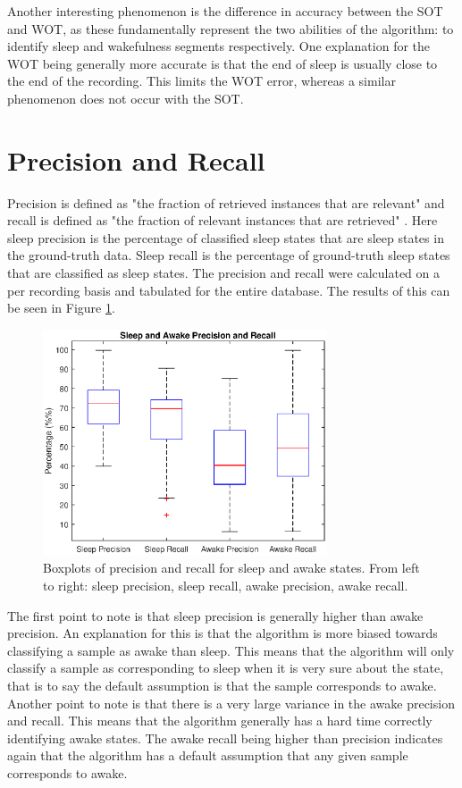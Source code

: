             Another interesting phenomenon is the difference in accuracy between the SOT and WOT, as these fundamentally represent the two abilities of the algorithm: to identify sleep and wakefulness segments respectively. One explanation for the WOT being generally more accurate is that the end of sleep is usually close to the end of the recording. This limits the WOT error, whereas a similar phenomenon does not occur with the SOT.

        \section{Precision and Recall}

            Precision is defined as "the fraction of retrieved instances that are relevant" and recall is defined as "the fraction of relevant instances that are retrieved" \cite{prec_rec}. Here sleep precision is the percentage of classified sleep states that are sleep states in the ground-truth data. Sleep recall is the percentage of ground-truth sleep states that are classified as sleep states. The precision and recall were calculated on a per recording basis and tabulated for the entire database. The results of this can be seen in Figure \ref{img_prec_recall}.

            \begin{figure}[h]
                \includegraphics[width=0.75\textwidth]{Images/prec_recall.eps}
                \centering
                \caption{Boxplots of precision and recall for sleep and awake states. From left to right: sleep precision, sleep recall, awake precision, awake recall.}
                \label{img_prec_recall}
            \end{figure}

            The first point to note is that sleep precision is generally higher than awake precision. An explanation for this is that the algorithm is more biased towards classifying a sample as awake than sleep. This means that the algorithm will only classify a sample as corresponding to sleep when it is very sure about the state, that is to say the default assumption is that the sample corresponds to awake. Another point to note is that there is a very large variance in the awake precision and recall. This means that the algorithm generally has a hard time correctly identifying awake states. The awake recall being higher than precision indicates again that the algorithm has a default assumption that any given sample corresponds to awake. 

